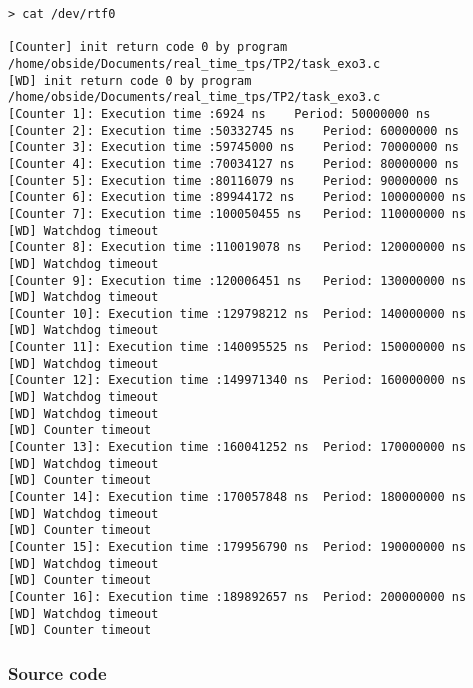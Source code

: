 \begin{lstlisting}[keywordstyle=\color{black}]
> cat /dev/rtf0

[Counter] init return code 0 by program /home/obside/Documents/real_time_tps/TP2/task_exo3.c
[WD] init return code 0 by program /home/obside/Documents/real_time_tps/TP2/task_exo3.c
[Counter 1]: Execution time :6924 ns	Period: 50000000 ns
[Counter 2]: Execution time :50332745 ns	Period: 60000000 ns
[Counter 3]: Execution time :59745000 ns	Period: 70000000 ns
[Counter 4]: Execution time :70034127 ns	Period: 80000000 ns
[Counter 5]: Execution time :80116079 ns	Period: 90000000 ns
[Counter 6]: Execution time :89944172 ns	Period: 100000000 ns
[Counter 7]: Execution time :100050455 ns	Period: 110000000 ns
[WD] Watchdog timeout
[Counter 8]: Execution time :110019078 ns	Period: 120000000 ns
[WD] Watchdog timeout
[Counter 9]: Execution time :120006451 ns	Period: 130000000 ns
[WD] Watchdog timeout
[Counter 10]: Execution time :129798212 ns	Period: 140000000 ns
[WD] Watchdog timeout
[Counter 11]: Execution time :140095525 ns	Period: 150000000 ns
[WD] Watchdog timeout
[Counter 12]: Execution time :149971340 ns	Period: 160000000 ns
[WD] Watchdog timeout
[WD] Watchdog timeout
[WD] Counter timeout
[Counter 13]: Execution time :160041252 ns	Period: 170000000 ns
[WD] Watchdog timeout
[WD] Counter timeout
[Counter 14]: Execution time :170057848 ns	Period: 180000000 ns
[WD] Watchdog timeout
[WD] Counter timeout
[Counter 15]: Execution time :179956790 ns	Period: 190000000 ns
[WD] Watchdog timeout
[WD] Counter timeout
[Counter 16]: Execution time :189892657 ns	Period: 200000000 ns
[WD] Watchdog timeout
[WD] Counter timeout
\end{lstlisting}

\subsubsection{Source code}

